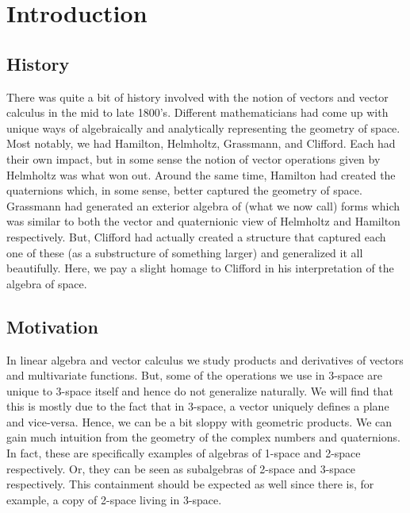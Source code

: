 
\section{Introduction}
\subsection{History}
There was quite a bit of history involved with the notion of vectors and vector calculus in the mid to late 1800's.  Different mathematicians had come up with unique ways of algebraically and analytically representing the geometry of space.  Most notably, we had Hamilton, Helmholtz, Grassmann, and Clifford.  Each had their own impact, but in some sense the notion of vector operations given by Helmholtz was what won out.  Around the same time, Hamilton had created the quaternions which, in some sense, better captured the geometry of space.  Grassmann had generated an exterior algebra of (what we now call) forms which was similar to both the vector and quaternionic view of Helmholtz and Hamilton respectively.  But, Clifford had actually created a structure that captured each one of these (as a substructure of something larger) and generalized it all beautifully. Here, we pay a slight homage to Clifford in his interpretation of the algebra of space.  

\subsection{Motivation}
In linear algebra and vector calculus we study products and derivatives of vectors and multivariate functions.  But, some of the operations we use in 3-space are unique to 3-space itself and hence do not generalize naturally.  We will find that this is mostly due to the fact that in 3-space, a vector uniquely defines a plane and vice-versa. Hence, we can be a bit sloppy with geometric products. We can gain much intuition from the geometry of the complex numbers and quaternions.  In fact, these are specifically examples of algebras of 1-space and 2-space respectively. Or, they can be seen as subalgebras of 2-space and 3-space respectively. This containment should be expected as well since there is, for example, a copy of 2-space living in 3-space.  

